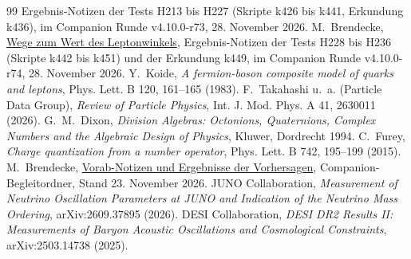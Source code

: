 \documentclass[11pt,a4paper]{article}
\begin{document}
\begin{thebibliography}{99}
Ergebnis-Notizen der Tests H213 bis H227 (Skripte k426 bis k441, Erkundung k436), im Companion Runde v4.10.0-r73, 28. November 2026.
M.~Brendecke, \href{https://github.com/Moriarty1982/QuantumSphere-Unfold/tree/8ac762a95afea9049fa750e8d6b8bb13ee7c5c49/notes/research/hilbert_shift_felder_2026_11_24}{Wege zum Wert des Leptonwinkels},
Ergebnis-Notizen der Tests H228 bis H236 (Skripte k442 bis k451) und der Erkundung k449, im Companion Runde v4.10.0-r74, 28. November 2026.
Y.~Koide, \emph{A fermion-boson composite model of quarks and leptons}, Phys. Lett. B 120, 161--165 (1983).
F.~Takahashi u.~a. (Particle Data Group), \emph{Review of Particle Physics}, Int. J. Mod. Phys. A 41, 2630011 (2026).
G.~M.~Dixon, \emph{Division Algebras: Octonions, Quaternions, Complex Numbers and the Algebraic Design of Physics}, Kluwer, Dordrecht 1994.
C.~Furey, \emph{Charge quantization from a number operator}, Phys. Lett. B 742, 195--199 (2015).
M.~Brendecke, \href{https://github.com/Moriarty1982/QuantumSphere-Unfold/tree/d2020d178a483d1baa7be3871ca2e9d597992059/notes/research/predictions}{Vorab-Notizen und Ergebnisse der Vorhersagen}, Companion-Begleitordner, Stand 23. November 2026.
JUNO Collaboration, \emph{Measurement of Neutrino Oscillation Parameters at JUNO and Indication of the Neutrino Mass Ordering},
arXiv:2609.37895 (2026).
DESI Collaboration, \emph{DESI DR2 Results II: Measurements of Baryon Acoustic Oscillations and Cosmological Constraints},
arXiv:2503.14738 (2025).
\end{thebibliography}
\endgroup
\clearpage
\appendix



\end{document}
